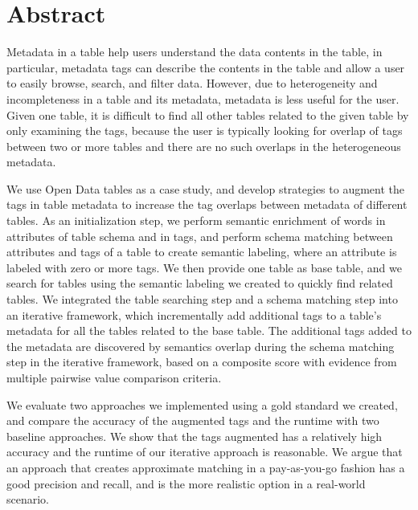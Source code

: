 
\chapter{Abstract}

Metadata in a table help users understand the data contents in the table, in particular, metadata tags can describe the contents in the table and allow a user to easily browse, search, and filter data. However, due to heterogeneity and incompleteness in a table and its metadata, metadata is less useful for the user. Given one table, it is difficult to find all other tables related to the given table by only examining the tags, because the user is typically looking for overlap of tags between two or more tables and there are no such overlaps in the heterogeneous metadata.

We use Open Data tables as a case study, and develop strategies to augment the tags in table metadata to increase the tag overlaps between metadata of different tables. As an initialization step, we perform semantic enrichment of words in attributes of table schema and in tags, and perform schema matching between attributes and tags of a table to create semantic labeling, where an attribute is labeled with zero or more tags. We then provide one table as base table, and we search for tables using the semantic labeling we created to quickly find related tables. We integrated the table searching step and a schema matching step into an iterative framework, which incrementally add additional tags to a table’s metadata for all the tables related to the base table. The additional tags added to the metadata are discovered by semantics overlap during the schema matching step in the iterative framework, based on a composite score with evidence from multiple pairwise value comparison criteria.

We evaluate two approaches we implemented using a gold standard we created, and compare the accuracy of the augmented tags and the runtime with two baseline approaches. We show that the
tags augmented has a relatively high accuracy and the runtime of our iterative approach is reasonable. We argue that an approach that creates approximate matching in a pay-as-you-go fashion has a good precision and recall, and is the more realistic option in a real-world scenario.
